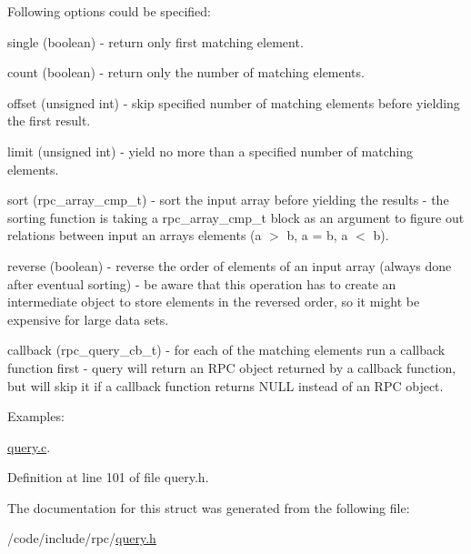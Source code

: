 Following options could be specified\+:
\begin{DoxyItemize}
\item single (boolean) -\/ return only first matching element.
\item count (boolean) -\/ return only the number of matching elements.
\item offset (unsigned int) -\/ skip specified number of matching elements before yielding the first result.
\item limit (unsigned int) -\/ yield no more than a specified number of matching elements.
\item sort (rpc\+\_\+array\+\_\+cmp\+\_\+t) -\/ sort the input array before yielding the results -\/ the sorting function is taking a rpc\+\_\+array\+\_\+cmp\+\_\+t block as an argument to figure out relations between input an array\textquotesingle{}s elements (a $>$ b, a = b, a $<$ b).
\item reverse (boolean) -\/ reverse the order of elements of an input array (always done after eventual sorting) -\/ be aware that this operation has to create an intermediate object to store elements in the reversed order, so it might be expensive for large data sets.
\item callback (rpc\+\_\+query\+\_\+cb\+\_\+t) -\/ for each of the matching elements run a callback function first -\/ query will return an R\+PC object returned by a callback function, but will skip it if a callback function returns N\+U\+LL instead of an R\+PC object. 
\end{DoxyItemize}\begin{Desc}
\item[Examples\+: ]\par
\hyperlink{query_8c-example}{query.\+c}.\end{Desc}


Definition at line 101 of file query.\+h.



The documentation for this struct was generated from the following file\+:\begin{DoxyCompactItemize}
\item 
/code/include/rpc/\hyperlink{query_8h}{query.\+h}\end{DoxyCompactItemize}
